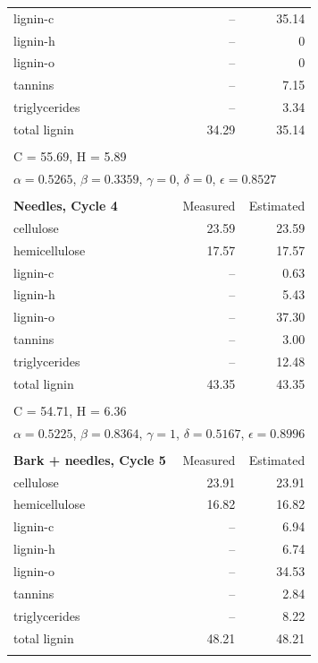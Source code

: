 \begin{longtable}{p{8cm}rr}
    lignin-c      & --    & 35.14 \\
    lignin-h      & --    & 0 \\
    lignin-o      & --    & 0 \\
    tannins       & --    & 7.15 \\
    triglycerides & --    & 3.34 \\
    total lignin  & 34.29 & 35.14 \\
    \\
    \multicolumn{3}{l}{C = 55.69, H = 5.89} \\
    \multicolumn{3}{l}{$\alpha = 0.5265$, $\beta = 0.3359$, $\gamma = 0$, $\delta = 0$, $\epsilon = 0.8527$} \\
    \\
    \textbf{Needles, Cycle 4} & Measured & Estimated \\
    \midrule
    cellulose     & 23.59 & 23.59 \\
    hemicellulose & 17.57 & 17.57 \\
    lignin-c      & --    & 0.63 \\
    lignin-h      & --    & 5.43 \\
    lignin-o      & --    & 37.30 \\
    tannins       & --    & 3.00 \\
    triglycerides & --    & 12.48 \\
    total lignin  & 43.35 & 43.35 \\
    \\
    \multicolumn{3}{l}{C = 54.71, H = 6.36} \\
    \multicolumn{3}{l}{$\alpha = 0.5225$, $\beta = 0.8364$, $\gamma = 1$, $\delta = 0.5167$, $\epsilon = 0.8996$} \\
    \\
    \textbf{Bark + needles, Cycle 5} & Measured & Estimated \\
    \midrule
    cellulose     & 23.91 & 23.91 \\
    hemicellulose & 16.82 & 16.82 \\
    lignin-c      & --    & 6.94 \\
    lignin-h      & --    & 6.74 \\
    lignin-o      & --    & 34.53 \\
    tannins       & --    & 2.84 \\
    triglycerides & --    & 8.22 \\
    total lignin  & 48.21 & 48.21 \\
    \\

\end{longtable}
